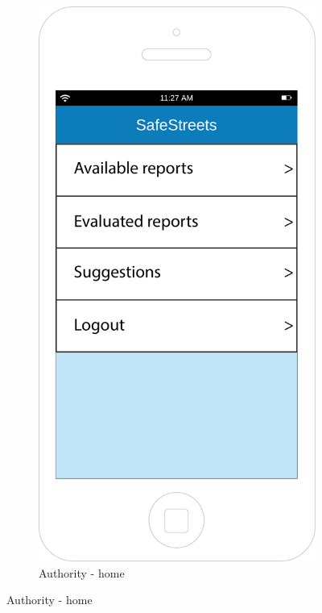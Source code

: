 \documentclass[12pt,a4paper]{report}
\begin{document}
		\begin{figure}[H]
		\begin{subfigure}{0.5\textwidth}
		\setcounter{subfigure}{6}
			\includegraphics[scale=0.25, center]{HomeAut}
			\caption{Authority - home}
			\label{Authority - home}

\end{subfigure}
\end{figure}
\end{document}
